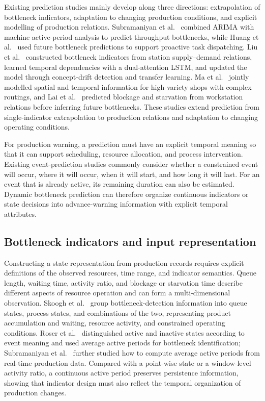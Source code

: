 \documentclass[a4paper,fleqn]{cas-dc}
\begin{document}
Existing prediction studies mainly develop along three directions: extrapolation of bottleneck indicators, adaptation to changing production conditions, and explicit modelling of production relations. Subramaniyan et al.~\cite{subramaniyan2018data} combined ARIMA with machine active-period analysis to predict throughput bottlenecks, while Huang et al.~\cite{huang2019proactive} used future bottleneck predictions to support proactive task dispatching. Liu et al.~\cite{liu2023lstmdam} constructed bottleneck indicators from station supply--demand relations, learned temporal dependencies with a dual-attention LSTM, and updated the model through concept-drift detection and transfer learning. Ma et al.~\cite{ma2023tusb} jointly modelled spatial and temporal information for high-variety shops with complex routings, and Lai et al.~\cite{lai2023bstan} predicted blockage and starvation from workstation relations before inferring future bottlenecks. These studies extend prediction from single-indicator extrapolation to production relations and adaptation to changing operating conditions.


For production warning, a prediction must have an explicit temporal meaning so that it can support scheduling, resource allocation, and process intervention. Existing event-prediction studies commonly consider whether a constrained event will occur, where it will occur, when it will start, and how long it will last. For an event that is already active, its remaining duration can also be estimated. Dynamic bottleneck prediction can therefore organize continuous indicators or state decisions into advance-warning information with explicit temporal attributes.


\subsection{Bottleneck indicators and input representation}

Constructing a state representation from production records requires explicit definitions of the observed resources, time range, and indicator semantics. Queue length, waiting time, activity ratio, and blockage or starvation time describe different aspects of resource operation and can form a multi-dimensional observation. Skoogh et al.~\cite{subramaniyan2023throughput} group bottleneck-detection information into queue states, process states, and combinations of the two, representing product accumulation and waiting, resource activity, and constrained operating conditions. Roser et al.~\cite{roser2001practical} distinguished active and inactive states according to event meaning and used average active periods for bottleneck identification; Subramaniyan et al.~\cite{subramaniyan2016realtime} further studied how to compute average active periods from real-time production data. Compared with a point-wise state or a window-level activity ratio, a continuous active period preserves persistence information, showing that indicator design must also reflect the temporal organization of production changes.
\end{document}
